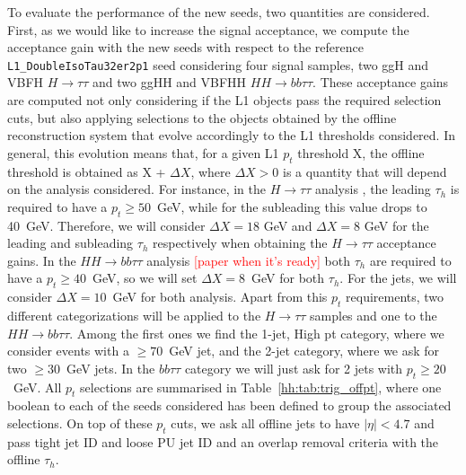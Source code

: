 \documentclass[../main.tex]{subfiles}
\begin{document}
To evaluate the performance of the new seeds, two quantities are considered. First, as we would like to increase the signal acceptance, we compute the acceptance gain with the new seeds with respect to the reference \texttt{L1\_DoubleIsoTau32er2p1} seed considering four signal samples, two ggH and VBFH $H\to\tau\tau$ and two ggHH and VBFHH $HH\to bb\tau\tau$. These acceptance gains are computed not only considering if the L1 objects pass the required selection cuts, but also applying selections to the objects obtained by the offline reconstruction system that evolve accordingly to the L1 thresholds considered. In general, this evolution means that, for a given L1 $p_t$ threshold X, the offline threshold is obtained as X + $\Delta X$, where $\Delta X>0$ is a quantity that will depend on the analysis considered. For instance, in the $H\to\tau\tau$ analysis \cite{hh:htt_2016}, the leading $\tau_h$ is required to have a $p_t\geq 50$~GeV, while for the subleading this value drops to 40~GeV. Therefore, we will consider $\Delta X=18$ GeV and $\Delta X=8$ GeV for the leading and subleading $\tau_h$ respectively when obtaining the $H\to\tau\tau$ acceptance gains. In the $HH\to bb\tau\tau$ analysis \textcolor{red}{[paper when it's ready]} both $\tau_h$ are required to have a $p_t\geq40$~GeV, so we will set $\Delta X=8$~GeV for both $\tau_h$. For the jets, we will consider $\Delta X=10$~GeV for both analysis. Apart from this $p_t$ requirements, two different categorizations will be applied to the $H\to\tau\tau$ samples and one to the $HH\to bb\tau\tau$. Among the first ones we find the 1-jet, High pt category, where we consider events with a $\geq70$~GeV jet, and the 2-jet category, where we ask for two $\geq30$~GeV jets. In the \textbf{$bb\tau\tau$} category we will just ask for 2 jets with $p_t\geq20$~GeV. All $p_t$ selections are summarised in Table~\ref{hh:tab:trig_offpt}, where one boolean to each of the seeds considered has been defined to group the associated selections. On top of these $p_t$ cuts, we ask all offline jets to have $|\eta|<4.7$ and pass tight jet ID and loose PU jet ID and an overlap removal criteria with the offline $\tau_h$.
\end{document}
